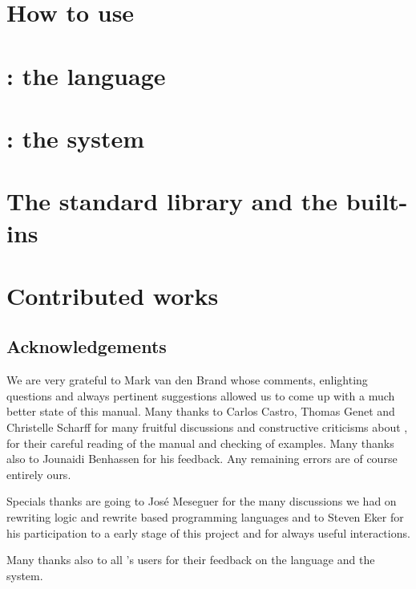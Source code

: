 \documentclass[11pt]{book}
\begin{document}
\chapter{How to use \elan}\label{install}


\chapter{\elan: the language}\label{language}


\chapter{\elan: the system}


\chapter{The standard library and the built-ins}\label{library}


\chapter{Contributed works}


\newpage
\section*{Acknowledgements}

We are very grateful to Mark van den Brand whose comments, enlighting questions
and always pertinent suggestions allowed us to come up with a much better state
of this manual. Many thanks to Carlos Castro, Thomas Genet and Christelle
Scharff for many fruitful discussions and constructive criticisms about \elan,
for their careful reading of the manual and checking of examples. Many thanks
also to Jounaidi Benhassen for his feedback.  Any remaining errors are of course
entirely ours.

Specials thanks are going to Jos{\'e} Meseguer for the many discussions we had on
rewriting logic and rewrite based programming languages and to Steven Eker for
his participation to a early stage of this project and for always useful
interactions.

Many thanks also to all \elan's users for their feedback on the language and the
system.



%



  
\end{document}
